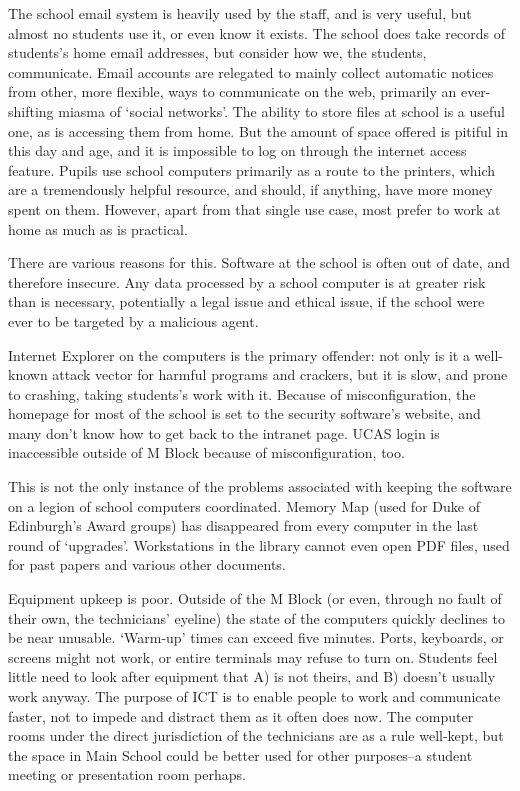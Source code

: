 \documentclass[a4paper,leqno,titlepage]{article}
\begin{document}
The school email system is heavily used by the staff, and is very useful, but
almost no students use it, or even know it exists. The school does take records
of students's home email addresses, but consider how we, the students,
communicate. Email accounts are relegated to mainly collect automatic notices
from other, more flexible, ways to communicate on the web, primarily an
ever-shifting miasma of `social networks'.
The ability to store files at school is a useful one, as is accessing them from
home. But the amount of space offered is pitiful in this day and age, and it is
impossible to log on through the internet access feature.
Pupils use school computers primarily as a route to the printers, which are a
tremendously helpful resource, and should, if anything, have more money spent on them.
However, apart from that single use case,
most prefer to work at home as much as is practical.

There are various reasons for this.
Software at the school is often out of date, and therefore insecure.
Any data processed by a school computer is at greater risk than is necessary,
potentially a legal issue and ethical issue, if the school were ever to be
targeted by a malicious agent.


Internet Explorer on the computers is the primary offender: not only is it
a well-known attack vector for harmful programs and crackers, but it is slow, and
prone to crashing, taking students's work with it. Because of misconfiguration,
the homepage for most of the school is set to the security software's website,
and many don't know how to get back to the intranet page. UCAS login is
inaccessible outside of M Block because of misconfiguration, too.


This is not the only instance of the problems associated with keeping the
software on a legion of school computers coordinated. Memory Map
(used for Duke of Edinburgh's Award groups) has disappeared from every computer
in the last round of `upgrades'. Workstations in the library cannot even open
PDF files, used for past papers and various other documents.


Equipment upkeep is poor. Outside of the M Block (or even, through no fault of
their own, the technicians' eyeline) the state of the computers quickly declines
to be near unusable. `Warm-up' times can exceed five minutes. Ports, keyboards,
or screens might not work, or entire terminals may refuse to turn on.
Students feel little need to look after equipment that A) is not theirs,
and B) doesn't usually work anyway. The purpose of ICT is to enable
people to work and communicate faster, not to impede and distract them as it
often does now. The computer rooms under the direct jurisdiction of the
technicians are as a rule well-kept, but the space in Main School could be
better used for other purposes--a student meeting or presentation room perhaps.
\end{document}
